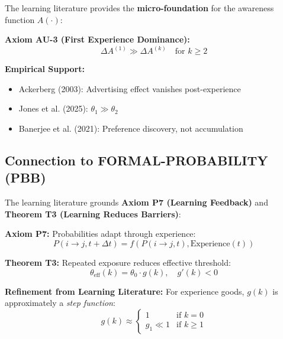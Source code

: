\documentclass[11pt, a4paper]{article}
\begin{document}
\begin{tcolorbox}[colback=blue!5!white, colframe=blue!75!black,
    title=Integration: LIT-LEARNING $\leftrightarrow$ CORE-AWARE]

The learning literature provides the \textbf{micro-foundation} for the awareness function $A(\cdot)$:

\textbf{Axiom AU-3 (First Experience Dominance):}
\begin{equation}
\Delta A^{(1)} \gg \Delta A^{(k)} \quad \text{for } k \geq 2
\end{equation}

\textbf{Empirical Support:}
\begin{itemize}[nosep]
    \item Ackerberg (2003): Advertising effect vanishes post-experience
    \item Jones et al. (2025): $\theta_1 \gg \theta_2$
    \item Banerjee et al. (2021): Preference discovery, not accumulation
\end{itemize}

\end{tcolorbox}

\subsection{Connection to FORMAL-PROBABILITY (PBB)}

\begin{tcolorbox}[colback=blue!5!white, colframe=blue!75!black,
    title=Integration: LIT-LEARNING $\leftrightarrow$ FORMAL-PROBABILITY]

The learning literature grounds \textbf{Axiom P7 (Learning Feedback)} and \textbf{Theorem T3 (Learning Reduces Barriers)}:

\textbf{Axiom P7:} Probabilities adapt through experience:
\begin{equation}
P(i \to j, t+\Delta t) = f(P(i \to j, t), \text{Experience}(t))
\end{equation}

\textbf{Theorem T3:} Repeated exposure reduces effective threshold:
\begin{equation}
\theta_{\text{eff}}(k) = \theta_0 \cdot g(k), \quad g'(k) < 0
\end{equation}

\textbf{Refinement from Learning Literature:}
For experience goods, $g(k)$ is approximately a \textit{step function}:
\begin{equation}
g(k) \approx \begin{cases}
1 & \text{if } k = 0 \\
g_1 \ll 1 & \text{if } k \geq 1
\end{cases}
\end{equation}

\end{tcolorbox}
\end{document}
